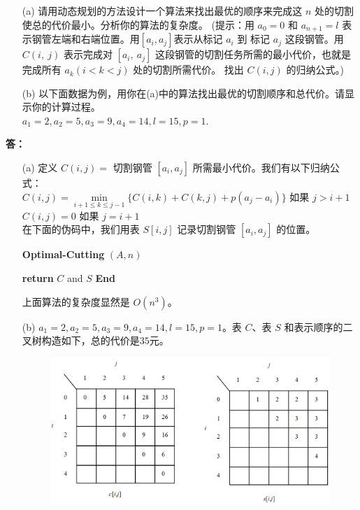 \documentclass[12pt,a4paper]{article}
\begin{document}
\begin{CJK}{UTF8}{song}
\begin{enumerate}
	\item[(a)]  请用动态规划的方法设计一个算法来找出最优的顺序来完成这 $n$ 处的切割使总的代价最小。分析你的算法的复杂度。 (提示：用 $a_0 = 0$ 和 $a_{n+1} = l$ 表示钢管左端和右端位置。用$[a_i, a_j]$表示从标记 $a_i$ 到 标记 $a_j$ 这段钢管。用 $C(i,\ j)$ 表示完成对 $[a_i,\ a_j]$ 这段钢管的切割任务所需的最小代价，也就是完成所有 $a_k (i < k < j)$ 处的切割所需代价。 找出 $C(i, j)$ 的归纳公式。)
	\item[(b)]  以下面数据为例，用你在(a)中的算法找出最优的切割顺序和总代价。请显示你的计算过程。\\
	$a_1 = 2, a_2 = 5, a_3 = 9, a_4 = 14, l = 15, p = 1$.
\end{enumerate}

\vspace{5pt}
\noindent
{\bf 答：}
\begin{enumerate}
	\item[(a)]  定义 $C(i, j) =$ 切割钢管 $[a_i, a_j]$ 所需最小代价。我们有以下归纳公式：\\
	$C(i, j) =  \min \limits_{i+1\le k \le j-1} \{ C(i, k) + C(k, j) + p(a_j - a_i) \}$ \hspace{1cm}如果 $j > i + 1$\\
	$C(i, j) = 0$ \hspace{8.1cm}如果 $j = i +1$\\
	在下面的伪码中，我们用表 $S[i, j]$ 记录切割钢管 $[a_i, a_j]$ 的位置。\\
		\begin{algorithm}[H]
		\caption{\textbf{Optimal-Cutting} $(A, n)$}
		\textbf{return} $C$ and $S$\;
		\textbf{End}\
	\end{algorithm}
	上面算法的复杂度显然是 $O(n^3)$。
	\item[(b)] $a_1 = 2, a_2 = 5, a_3 = 9, a_4 = 14, l = 15, p = 1$。表 $C$、表 $S$ 和表示顺序的二叉树构造如下，总的代价是$35$元。
	\begin{figure}[H]
		\centering %
		\includegraphics[width=1\textwidth]{2(1)} %

\end{figure}
\end{enumerate}
\end{CJK}
\end{document}

